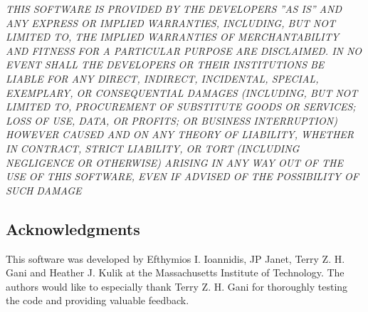 \textit{THIS SOFTWARE IS PROVIDED BY THE DEVELOPERS ''AS IS'' AND ANY
EXPRESS OR IMPLIED WARRANTIES, INCLUDING, BUT NOT LIMITED TO, THE IMPLIED
WARRANTIES OF MERCHANTABILITY AND FITNESS FOR A PARTICULAR PURPOSE ARE
DISCLAIMED. IN NO EVENT SHALL THE DEVELOPERS OR THEIR INSTITUTIONS BE LIABLE FOR ANY
DIRECT, INDIRECT, INCIDENTAL, SPECIAL, EXEMPLARY, OR CONSEQUENTIAL DAMAGES
(INCLUDING, BUT NOT LIMITED TO, PROCUREMENT OF SUBSTITUTE GOODS OR SERVICES;
LOSS OF USE, DATA, OR PROFITS; OR BUSINESS INTERRUPTION) HOWEVER CAUSED AND
ON ANY THEORY OF LIABILITY, WHETHER IN CONTRACT, STRICT LIABILITY, OR TORT
(INCLUDING NEGLIGENCE OR OTHERWISE) ARISING IN ANY WAY OUT OF THE USE OF THIS
SOFTWARE, EVEN IF ADVISED OF THE POSSIBILITY OF SUCH DAMAGE}


\subsection{Acknowledgments}
This software was developed by Efthymios I. Ioannidis, JP Janet, Terry Z. H. Gani  and Heather J. Kulik at the Massachusetts Institute of Technology. The authors would like to especially thank Terry Z. H. Gani for thoroughly testing the code and providing valuable feedback.